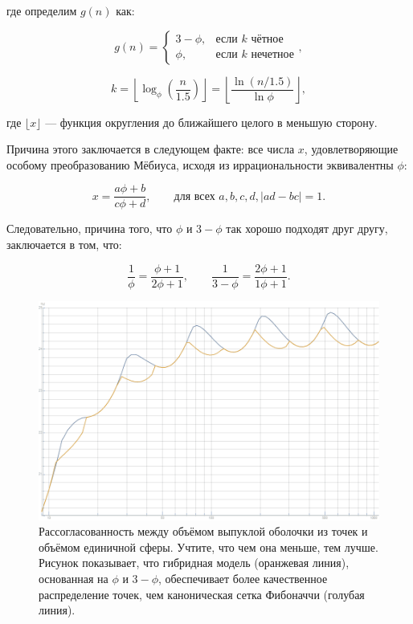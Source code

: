 \documentclass[12pt, a4paper]{article}
\begin{document}
\noindent где определим $g(n)$ как:

\begin{displaymath}
    g(n) =
        \begin{cases}
            3-\phi, & \text{если $k$ чётное} \\
            \phi, & \text{если $k$ нечетное}
        \end{cases},
    \tag{5}
\end{displaymath}

\begin{displaymath}
    k =
        \left\lfloor
            \log_{\phi}(\frac{n}{1.5})
        \right\rfloor
      =
        \left\lfloor
            \frac{\ln (n/1.5)}{\ln \phi }
        \right\rfloor,
\end{displaymath}

\noindent где $\lfloor x \rfloor$ — функция округления до ближайшего целого в меньшую сторону.

Причина этого заключается в следующем факте: все числа $x$, удовлетворяющие особому преобразованию Мёбиуса, исходя из иррациональности эквивалентны $\phi$:

\begin{displaymath}
    x = \frac{a\phi+b}{c\phi+d}, \qquad \textrm{для всех } a,b,c,d, |ad-bc|=1.
\end{displaymath}

Следовательно, причина того, что $\phi$ и $3-\phi$ так хорошо подходят друг другу, заключается в том, что:

\begin{displaymath}
    \frac{1}{\phi} = \frac{\phi+1}{2\phi+1}, \qquad \frac{1}{3-\phi}= \frac{2\phi+1}{1\phi+1}.
\end{displaymath}

\begin{figure}[H]
    \centering
    \includegraphics[width=\textwidth]{images/4.png}
    \caption{Рассогласованность между объёмом выпуклой оболочки из точек и объёмом единичной сферы. Учтите, что чем она меньше, тем лучше. Рисунок показывает, что гибридная модель (оранжевая линия), основанная на $\phi$ и $3-\phi$, обеспечивает более качественное распределение точек, чем каноническая сетка Фибоначчи (голубая линия).}
\end{figure}
\end{document}
